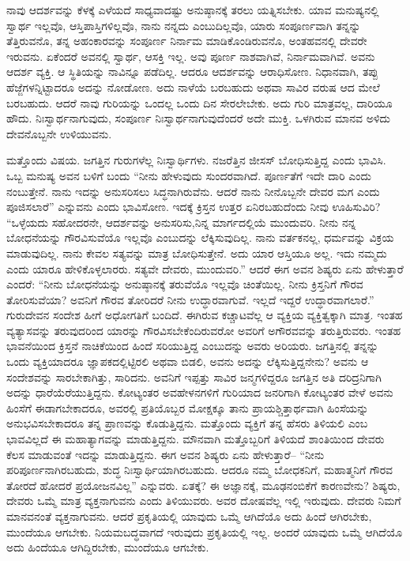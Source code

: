 ನಾವು ಆದರ್ಶವನ್ನು ಕೆಳಕ್ಕೆ ಎಳೆಯದೆ ಸಾಧ್ಯವಾದಷ್ಟು ಅನುಷ್ಠಾನಕ್ಕೆ ತರಲು ಯತ್ನಿಸಬೇಕು. ಯಾವ ಮನುಷ್ಯನಲ್ಲಿ ಸ್ವಾರ್ಥ ಇಲ್ಲವೊ, ಆಸ್ತಿಪಾಸ್ತಿಗಳಿಲ್ಲವೊ, ನಾನು ನನ್ನದು ಎಂಬುದಿಲ್ಲವೊ, ಯಾರು ಸಂಪೂರ್ಣವಾಗಿ ತನ್ನನ್ನು ತೆತ್ತಿರುವನೊ, ತನ್ನ ಅಹಂಕಾರವನ್ನು ಸಂಪೂರ್ಣ ನಿರ್ನಾಮ ಮಾಡಿಕೊಂಡಿರುವನೊ, ಅಂತಹವನಲ್ಲಿ ದೇವರೇ ಇರುವನು. ಏಕೆಂದರೆ ಅವನಲ್ಲಿ ಸ್ವಾರ್ಥ, ಆಸಕ್ತಿ ಇಲ್ಲ. ಅವು ಪೂರ್ಣ ನಾಶವಾಗಿವೆ, ನಿರ್ನಾಮ\-ವಾಗಿವೆ. ಅವನು ಆದರ್ಶ ವ್ಯಕ್ತಿ. ಆ ಸ್ಥಿತಿಯನ್ನು ನಾವಿನ್ನೂ ಪಡೆದಿಲ್ಲ. ಆದರೂ ಆದರ್ಶವನ್ನು ಆರಾಧಿಸೋಣ. ನಿಧಾನವಾಗಿ, ತಪ್ಪು ಹೆಜ್ಜೆಗಳನ್ನಿಟ್ಟಾದರೂ ಅದನ್ನು ನೋಡೋಣ. ಅದು ನಾಳೆಯೆ ಬರಬಹುದು ಅಥವಾ ಸಾವಿರ ವರುಷ ಆದ ಮೇಲೆ ಬರಬಹುದು. ಆದರೆ ನಾವು ಗುರಿಯನ್ನು ಒಂದಲ್ಲ ಒಂದು ದಿನ ಸೇರಲೇಬೇಕು. ಅದು ಗುರಿ ಮಾತ್ರವಲ್ಲ, ದಾರಿಯೂ ಹೌದು. ನಿಃಸ್ವಾರ್ಥನಾಗುವುದು, ಸಂಪೂರ್ಣ ನಿಃಸ್ವಾರ್ಥನಾಗುವುದೆಂದರೆ ಅದೇ ಮುಕ್ತಿ. ಒಳಗಿರುವ ಮಾನವ ಅಳಿದು ದೇವನೊಬ್ಬನೇ ಉಳಿಯುವನು.

ಮತ್ತೊಂದು ವಿಷಯ. ಜಗತ್ತಿನ ಗುರುಗಳೆಲ್ಲ ನಿಃಸ್ವಾರ್ಥಿಗಳು. ನಜರೆತ್ತಿನ ಜೀಸಸ್​ ಬೋಧಿಸುತ್ತಿದ್ದ ಎಂದು ಭಾವಿಸಿ. ಒಬ್ಬ ಮನುಷ್ಯ ಅವನ ಬಳಿಗೆ ಬಂದು “ನೀನು ಹೇಳುವುದು ಸುಂದರವಾಗಿದೆ. ಪೂರ್ಣತೆಗೆ ಇದೇ ದಾರಿ ಎಂದು ನಂಬುತ್ತೇನೆ. ನಾನು ಇದನ್ನು ಅನುಸರಿಸಲು ಸಿದ್ಧನಾಗಿರುವೆನು. ಆದರೆ ನಾನು ನೀನೊಬ್ಬನೇ ದೇವರ ಮಗ ಎಂದು ಪೂಜಿಸಲಾರೆ” ಎನ್ನುವನು ಎಂದು ಭಾವಿಸೋಣ. ಇದಕ್ಕೆ ಕ್ರಿಸ್ತನ ಉತ್ತರ ಏನಿರಬಹುದೆಂದು ನೀವು ಊಹಿಸುವಿರಿ? “ಒಳ್ಳೆಯದು ಸಹೋದರನೇ, ಆದರ್ಶವನ್ನು ಅನುಸರಿಸು,\break ನಿನ್ನ ಮಾರ್ಗದಲ್ಲಿಯೆ ಮುಂದುವರಿ. ನೀನು ನನ್ನ ಬೋಧನೆಯನ್ನು ಗೌರವಿಸುವೆಯೊ ಇಲ್ಲವೊ ಎಂಬುದನ್ನು ಲೆಕ್ಕಿಸುವುದಿಲ್ಲ. ನಾನು ವರ್ತಕನಲ್ಲ, ಧರ್ಮವನ್ನು ವಿಕ್ರಯ ಮಾಡುವುದಿಲ್ಲ. ನಾನು ಕೇವಲ ಸತ್ಯವನ್ನು ಮಾತ್ರ ಬೋಧಿಸುತ್ತೇನೆ. ಅದು ಯಾರ ಆಸ್ತಿಯೂ ಅಲ್ಲ. ಇದು ನಮ್ಮದು ಎಂದು ಯಾರೂ ಹೇಳಿಕೊಳ್ಳಲಾರರು. ಸತ್ಯವೇ ದೇವರು, ಮುಂದುವರಿ.” ಆದರೆ ಈಗ ಅವನ ಶಿಷ್ಯರು ಏನು ಹೇಳುತ್ತಾರೆ ಎಂದರೆ: “ನೀನು ಬೋಧನೆಯನ್ನು ಅನುಷ್ಠಾನಕ್ಕೆ ತರುವೆಯೊ ಇಲ್ಲವೊ ಚಿಂತೆಯಿಲ್ಲ. ನೀನು ಕ್ರಿಸ್ತನಿಗೆ ಗೌರವ ತೋರಿಸುವೆಯಾ? ಅವನಿಗೆ ಗೌರವ ತೋರಿದರೆ ನೀನು ಉದ್ಧಾರವಾಗುವೆ. ಇಲ್ಲದೆ ಇದ್ದರೆ ಉದ್ಧಾರವಾಗಲಾರೆ.” ಗುರುದೇವನ ಸಂದೇಶ ಹೀಗೆ ಅಧೋಗತಿಗೆ ಬಂದಿದೆ. ಈಗಿರುವ ಕಚ್ಚಾಟವೆಲ್ಲ ಆ ವ್ಯಕ್ತಿಯ ವ್ಯಕ್ತಿತ್ವಕ್ಕಾಗಿ ಮಾತ್ರ. ಇಂತಹ ವ್ಯತ್ಯಾಸವನ್ನು ತರುವುದರಿಂದ ಯಾರನ್ನು ಗೌರವಿಸಬೇಕೆಂದಿರುವರೋ ಅವರಿಗೆ ಅಗೌರವವನ್ನು ತರುತ್ತಿರುವರು. ಇಂತಹ ಭಾವನೆಯಿಂದ ಕ್ರಿಸ್ತನೆ ನಾಚಿಕೆಯಿಂದ ಹಿಂದೆ ಸರಿಯುತ್ತಿದ್ದ ಎಂಬುದನ್ನು ಅವರು ಅರಿಯರು. ಜಗತ್ತಿನಲ್ಲಿ ತನ್ನನ್ನು ಒಂದು ವ್ಯಕ್ತಿಯಾದರೂ ಜ್ಞಾಪಕದಲ್ಲಿಟ್ಟಿರಲಿ ಅಥವಾ ಬಿಡಲಿ, ಅವನು ಅದನ್ನು ಲೆಕ್ಕಿಸುತ್ತಿದ್ದನೇನು? ಅವನು ಆ ಸಂದೇಶವನ್ನು ಸಾರಬೇಕಾಗಿತ್ತು, ಸಾರಿದನು. ಅವನಿಗೆ ಇಪ್ಪತ್ತು ಸಾವಿರ ಜನ್ಮಗಳಿದ್ದರೂ ಜಗತ್ತಿನ ಅತಿ ದರಿದ್ರನಿಗಾಗಿ ಅದನ್ನು ಧಾರೆಯೆರೆಯುತ್ತಿದ್ದನು. ಕೋಟ್ಯಂತರ ಅವಹೇಳನಗಳಿಗೆ ಗುರಿಯಾದ ಜನರಿಗಾಗಿ ಕೋಟ್ಯಂತರ ವೇಳೆ ಅವನು ಹಿಂಸೆಗೆ ಈಡಾಗಬೇಕಾದರೂ, ಅವರಲ್ಲಿ ಪ್ರತಿಯೊಬ್ಬರ ಮೋಕ್ಷಕ್ಕೂ ತಾನು ಪ್ರಾಯಶ್ಚಿತ್ತಾರ್ಥವಾಗಿ ಹಿಂಸೆಯನ್ನು ಅನುಭವಿಸಬೇಕಾದರೂ ತನ್ನ ಪ್ರಾಣವನ್ನು ಕೊಡುತ್ತಿದ್ದನು. ಮತ್ತೊಂದು ವ್ಯಕ್ತಿಗೆ ತನ್ನ ಹೆಸರು ತಿಳಿಯಲಿ ಎಂಬ ಭಾವವಿಲ್ಲದೆ ಈ ಮಹಾತ್ಯಾಗವನ್ನು ಮಾಡುತ್ತಿದ್ದನು. ಮೌನವಾಗಿ ಮತ್ತೊಬ್ಬರಿಗೆ ತಿಳಿಯದೆ ಶಾಂತಿಯಿಂದ ದೇವರು ಕೆಲಸ ಮಾಡುವಂತೆ ಇದನ್ನು ಮಾಡುತ್ತಿದ್ದನು. ಈಗ ಅವನ ಶಿಷ್ಯರು ಏನು ಹೇಳುತ್ತಾರೆ– “ನೀನು ಪರಿಪೂರ್ಣನಾಗಿರಬಹುದು, ಶುದ್ಧ ನಿಃಸ್ವಾರ್ಥಿಯಾಗಿರಬಹುದು. ಆದರೂ ನಮ್ಮ ಬೋಧಕನಿಗೆ, ಮಹಾತ್ಮನಿಗೆ ಗೌರವ ತೋರದೆ ಹೋದರೆ ಪ್ರಯೋಜನವಿಲ್ಲ” ಎನ್ನುವರು. ಏತಕ್ಕೆ? ಈ ಅಜ್ಞಾನಕ್ಕೆ, ಮೂಢನಂಬಿಕೆಗೆ ಕಾರಣವೇನು? ಶಿಷ್ಯರು, ದೇವರು ಒಮ್ಮೆ ಮಾತ್ರ ವ್ಯಕ್ತನಾಗುವನು ಎಂದು ತಿಳಿಯುವರು. ಅವರ ದೋಷವೆಲ್ಲ ಇಲ್ಲಿ ಇರುವುದು. ದೇವರು ನಿಮಗೆ ಮಾನವನಂತೆ ವ್ಯಕ್ತನಾಗುವನು. ಆದರೆ ಪ್ರಕೃತಿಯಲ್ಲಿ ಯಾವುದು ಒಮ್ಮೆ ಆಗಿದೆಯೊ ಅದು ಹಿಂದೆ ಆಗಿರಬೇಕು, ಮುಂದೆಯೂ ಆಗಬೇಕು. ನಿಯಮಬದ್ಧವಾಗದೆ ಇರುವುದು ಪ್ರಕೃತಿಯಲ್ಲಿ ಇಲ್ಲ. ಅಂದರೆ ಯಾವುದು ಒಮ್ಮೆ ಆಗಿದೆಯೊ ಅದು ಹಿಂದೆಯೂ ಆಗಿದ್ದಿರಬೇಕು, ಮುಂದೆಯೂ ಆಗಬೇಕು.


